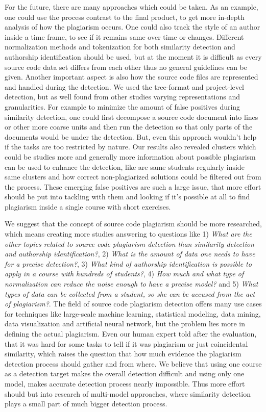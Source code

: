 For the future, there are many approaches which could be taken. As an example, one could use the process contrast to the final product, to get more in-depth analysis of how the plagiarism occurs. One could also track the style of an author inside a time frame, to see if it remains same over time or changes. Different normalization methods and tokenization for both similarity detection and authorship identification should be used, but at the moment it is difficult as every source code data set differs from each other thus no general guidelines can be given. Another important aspect is also how the source code files are represented and handled during the detection. We used the tree-format and project-level detection, but as well found from other studies varying representations and granularities. For example to minimize the amount of false positives during similarity detection, one could first decompose a source code document into lines or other more coarse units and then run the detection so that only parts of the documents would be under the detection. But, even this approach wouldn't help if the tasks are too restricted by nature. Our results also revealed clusters which could be studies more and generally more information about possible plagiarism can be used to enhance the detection, like are same students regularly inside same clusters and how correct non-plagiarized solutions could be filtered out from the process. These emerging false positives are such a large issue, that more effort should be put into tackling with them and looking if it's possible at all to find plagiarism inside a single course with short exercises. 

We suggest that the concept of source code plagiarism should be more researched, which means creating more studies answering to questions like 1) \emph{What are the other topics related to source code plagiarism detection than similarity detection and authorship identification?}, 2) \emph{What is the amount of data one needs to have for a precise detection?}, 3) \emph{What kind of authorship identification is possible to apply in a course with hundreds of students?}, 4) \emph{How much and what type of normalization can reduce the noise enough to have a precise model?} and 5) \emph{What types of data can be collected from a student, so she can be accused from the act of plagiarism?}. The field of source code plagiarism detection offers many use cases for techniques like large-scale machine learning, statistical modeling, data mining, data visualization and artificial neural network, but the problem lies more in defining the actual plagiarism. Even our human expert told after the evaluation, that it was hard for some tasks to tell if it was plagiarism or just coincidental similarity, which raises the question that how much evidence the plagiarism detection process should gather and from where. We believe that using one course as a detection target makes the overall detection difficult and using only one model, makes accurate detection process nearly impossible. Thus more effort should but into research of multi-model approaches, where similarity detection plays a small part of much bigger detection process. 


